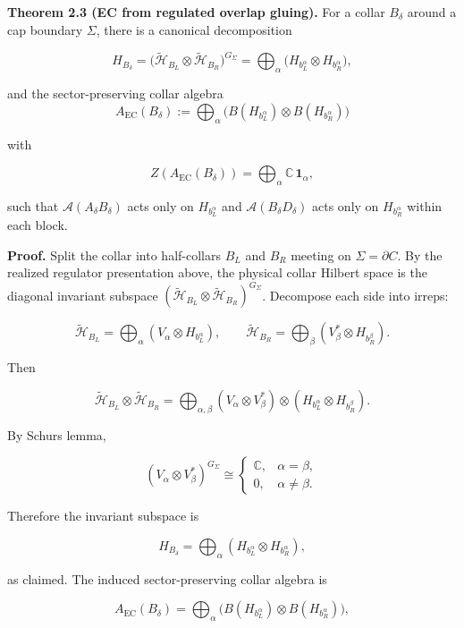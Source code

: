 \textbf{Theorem 2.3 (EC from regulated overlap gluing).} For a collar \(B_\delta\) around a cap boundary \(\Sigma\), there is a canonical decomposition

\[
H_{B_\delta} = \bigl(\tilde{\mathcal H}_{B_L}\otimes \tilde{\mathcal H}_{B_R}\bigr)^{G_\Sigma}
= \bigoplus_{\alpha}
\bigl(H_{b_L^{\alpha}} \otimes H_{b_R^{\alpha}}\bigr),
\]

and the sector-preserving collar algebra
\[
A_{\mathrm{EC}}(B_\delta):=\bigoplus_\alpha
\bigl(B(H_{b_L^\alpha}) \otimes B(H_{b_R^\alpha})\bigr)
\]

with

\[
Z(A_{\mathrm{EC}}(B_\delta)) = \bigoplus_\alpha \mathbb C\,\mathbf 1_\alpha,
\]

such that \(\mathcal{A}(A_\delta B_\delta)\) acts only on \(H_{b_L^\alpha}\) and \(\mathcal{A}(B_\delta D_\delta)\) acts only on \(H_{b_R^\alpha}\) within each block.

\textbf{Proof.} Split the collar into half-collars \(B_L\) and \(B_R\) meeting on \(\Sigma = \partial C\). By the realized regulator presentation above, the physical collar Hilbert space is the diagonal invariant subspace \((\tilde{\mathcal H}_{B_L} \otimes \tilde{\mathcal H}_{B_R})^{G_\Sigma}\). Decompose each side into irreps:

\[
\tilde{\mathcal H}_{B_L} = \bigoplus_\alpha (V_\alpha \otimes H_{b_L^\alpha}),\qquad
\tilde{\mathcal H}_{B_R} = \bigoplus_\beta (V_\beta^* \otimes H_{b_R^\beta}).
\]

Then

\[
\tilde{\mathcal H}_{B_L} \otimes \tilde{\mathcal H}_{B_R}
= \bigoplus_{\alpha,\beta}
(V_\alpha \otimes V_\beta^*) \otimes
(H_{b_L^\alpha} \otimes H_{b_R^\beta}).
\]

By Schur\textquotesingle s lemma,

\[
(V_\alpha \otimes V_\beta^*)^{G_\Sigma}
\cong
\begin{cases}
\mathbb C, & \alpha=\beta,\\
0, & \alpha\ne\beta.
\end{cases}
\]

Therefore the invariant subspace is

\[
H_{B_\delta} = \bigoplus_\alpha (H_{b_L^\alpha} \otimes H_{b_R^\alpha}),
\]

as claimed. The induced sector-preserving collar algebra is

\[
A_{\mathrm{EC}}(B_\delta) = \bigoplus_\alpha
\bigl(B(H_{b_L^\alpha}) \otimes B(H_{b_R^\alpha})\bigr),
\]

